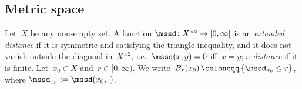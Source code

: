 \documentclass[11pt,letterpaper]{amsart}
\DeclareMathOperator{\eqdef}{\coloneqq}
\newcommand{\rar}{\rightarrow}
\newcommand{\set}[1]{\left\{#1\right\}}							%
\newcommand{\tym}[1]{{\scriptscriptstyle{\times #1}}}
\newcommand{\R}{{\mathbb R}}
\newcommand{\fstop}{\,\,\mathrm{.}}
\renewcommand{\1}{\mathbf 1}
\numberwithin{equation}{section}
\theoremstyle{plain}
\theoremstyle{definition}
\theoremstyle{remark}
\begin{document}
\subsection{Metric space} 
Let~$X$ be any non-empty set. A function $\mssd\colon X^\tym{2}\rar [0,\infty]$ is an \emph{extended distance} if it is symmetric and satisfying the triangle inequality, and it does not vanish outside the diagonal in~$X^{\tym{2}}$, i.e.~$\mssd(x,y)=0$ iff~$x=y$; a \emph{distance} if it is finite. 
%
Let~$x_0\in X$ and~$r\in [0,\infty)$. We write~$B_r(x_0)\eqdef \set{\mssd_{x_0} \le r}$, where $\mssd_{x_0}:=\mssd(x_0, \cdot)$. 
%
\end{document}
